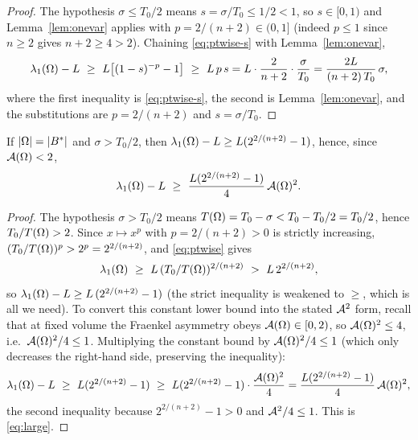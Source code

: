 \begin{proof}
The hypothesis $\sigma\le T_0/2$ means $s=\sigma/T_0\le1/2<1$, so
$s\in[0,1)$ and Lemma~\ref{lem:onevar} applies with $p=2/(n+2)\in(0,1]$
(indeed $p\le1$ since $n\ge2$ gives $n+2\ge4>2$). Chaining
\eqref{eq:ptwise-s} with Lemma~\ref{lem:onevar},
\[
  \lambda_1(\Omega)-L
  \ \ge\ L\bigl[(1-s)^{-p}-1\bigr]
  \ \ge\ L\,p\,s
  =L\cdot\frac{2}{n+2}\cdot\frac{\sigma}{T_0}
  =\frac{2L}{(n+2)\,T_0}\,\sigma,
\]
where the first inequality is \eqref{eq:ptwise-s}, the second is
Lemma~\ref{lem:onevar}, and the substitutions are $p=2/(n+2)$ and
$s=\sigma/T_0$.
\end{proof}

\begin{lemma}\label{lem:large}
If $\left|\Omega\right|=\left|B^*\right|$ and $\sigma>T_0/2$, then
$\lambda_1(\Omega)-L\ge L(2^{2/(n+2)}-1)$, hence, since $\mathcal A(\Omega)<2$,
\begin{equation}\label{eq:large}
  \lambda_1(\Omega)-L\ \ge\ \frac{L(2^{2/(n+2)}-1)}{4}\,\mathcal A(\Omega)^2 .
\end{equation}
\end{lemma}

\begin{proof}
The hypothesis $\sigma>T_0/2$ means $T(\Omega)=T_0-\sigma<T_0-T_0/2=T_0/2$,
hence $T_0/T(\Omega)>2$. Since $x\mapsto x^{p}$ with $p=2/(n+2)>0$ is strictly
increasing, $(T_0/T(\Omega))^{p}>2^{p}=2^{2/(n+2)}$, and \eqref{eq:ptwise}
gives
\[
  \lambda_1(\Om)\ \ge\ L\,(T_0/T(\Om))^{2/(n+2)}\ >\ L\,2^{2/(n+2)},
\]
so $\lambda_1(\Omega)-L\ge L\,(2^{2/(n+2)}-1)$ (the strict inequality is
weakened to $\ge$, which is all we need). To convert this constant lower
bound into the stated $\mathcal A^2$ form, recall that at fixed volume the Fraenkel
asymmetry obeys $\mathcal A(\Omega)\in[0,2)$, so $\mathcal A(\Omega)^2\le4$, i.e.\
$\mathcal A(\Omega)^2/4\le1$. Multiplying the constant bound by $\mathcal A(\Omega)^2/4\le1$
(which only decreases the right-hand side, preserving the inequality):
\[
  \lambda_1(\Omega)-L\ \ge\ L(2^{2/(n+2)}-1)
  \ \ge\ L(2^{2/(n+2)}-1)\cdot\frac{\mathcal A(\Omega)^2}{4}
  =\frac{L(2^{2/(n+2)}-1)}{4}\,\mathcal A(\Omega)^2 ,
\]
the second inequality because $2^{2/(n+2)}-1>0$ and $\mathcal A^2/4\le1$. This is
\eqref{eq:large}.
\end{proof}

